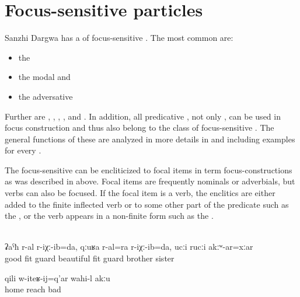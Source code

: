 
\section{Focus-sensitive particles}
\label{sec:Focus-sensitive particles}

Sanzhi Dargwa has a  of focus-sensitive . The most common  are:
%
\begin{itemize}
	\item	the   
	\item	the modal   and 
	\item	the adversative  
\end{itemize}

Further  are  ,  ,  ,  , and  . In addition, all predicative , not only , can be used in focus construction and thus also belong to the class of focus-sensitive . The general functions of these  are analyzed in more details in  and  including examples for every .

The focus-sensitive  can be encliticized to focal items in term focus-constructions as was described in  above. Focal items are frequently nominals or adverbials, but verbs can also be focused. If the focal item is a verb, the enclitics are either added to the finite inflected verb or to some other part of the predicate such as the  , or the verb appears in a non-finite form such as the  .
%
\begin{exe}
	\\\label{ex:He guarded me well, he also guarded me safely, although without brothers and sisters}%
	\gll	ʡaˁħ	r-al	r-iχː-ib=da,	qːuʁa	r-al=ra	r-iχː-ib=da, ucːi	rucːi	akːʷ-ar=xːar\\
		good	\tsc{f-}fit	guard	beautiful	\tsc{f-}fit	guard brother	sister	\\
	\glt	{}

	\ex	\label{ex:‎Coming home is not bad}
	\gll	qili	w-iteʁ-ij=q'ar	wahi-l	akːu\\
		home	reach	bad	\\
	\glt	{}
\end{exe}


